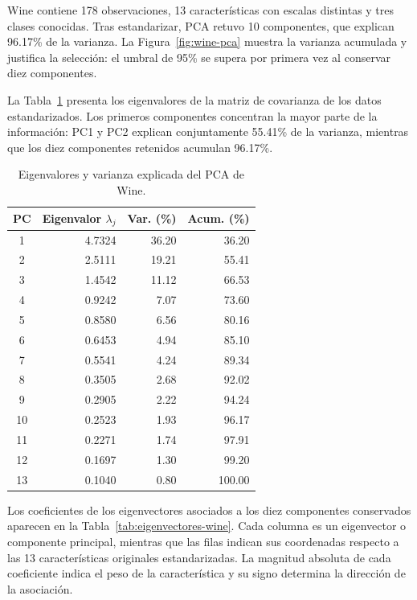 \documentclass[10pt,twocolumn]{article}
\begin{document}
Wine contiene 178 observaciones, 13 características con escalas distintas y
tres clases conocidas. Tras estandarizar, PCA retuvo 10 componentes, que
explican 96.17\% de la varianza. La Figura~\ref{fig:wine-pca} muestra la
varianza acumulada y justifica la selección: el umbral de 95\% se supera por
primera vez al conservar diez componentes.

La Tabla~\ref{tab:eigenvalores-wine} presenta los eigenvalores de la matriz de
covarianza de los datos estandarizados. Los primeros componentes concentran la
mayor parte de la información: PC1 y PC2 explican conjuntamente 55.41\% de la
varianza, mientras que los diez componentes retenidos acumulan 96.17\%.

\begin{table}[H]
\centering
\caption{Eigenvalores y varianza explicada del PCA de Wine.}
\label{tab:eigenvalores-wine}
\small
\setlength{\tabcolsep}{4pt}
\begin{tabular}{crrr}
\toprule
PC & Eigenvalor $\lambda_j$ & Var. (\%) & Acum. (\%)\\
\midrule
1  & 4.7324 & 36.20 & 36.20\\
2  & 2.5111 & 19.21 & 55.41\\
3  & 1.4542 & 11.12 & 66.53\\
4  & 0.9242 &  7.07 & 73.60\\
5  & 0.8580 &  6.56 & 80.16\\
6  & 0.6453 &  4.94 & 85.10\\
7  & 0.5541 &  4.24 & 89.34\\
8  & 0.3505 &  2.68 & 92.02\\
9  & 0.2905 &  2.22 & 94.24\\
10 & 0.2523 &  1.93 & 96.17\\
11 & 0.2271 &  1.74 & 97.91\\
12 & 0.1697 &  1.30 & 99.20\\
13 & 0.1040 &  0.80 & 100.00\\
\bottomrule
\end{tabular}
\end{table}

Los coeficientes de los eigenvectores asociados a los diez componentes
conservados aparecen en la Tabla~\ref{tab:eigenvectores-wine}. Cada columna es
un eigenvector o componente principal, mientras que las filas indican sus
coordenadas respecto a las 13 características originales estandarizadas. La
magnitud absoluta de cada coeficiente indica el peso de la característica y su
signo determina la dirección de la asociación.
\end{document}
